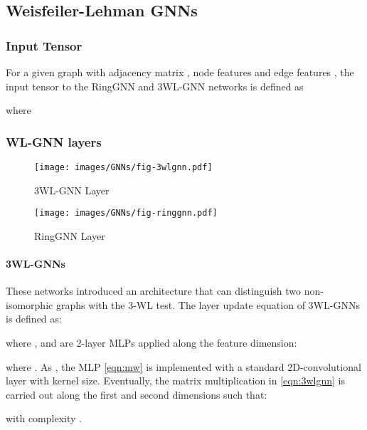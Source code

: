 \documentclass{article}
\begin{document}
\subsection{Weisfeiler-Lehman GNNs}
\label{sec:wlgnns}


\subsubsection{Input Tensor}


For a given graph with adjacency matrix , node features  and edge features , the input tensor to the RingGNN and 3WL-GNN networks is defined as 

where






\subsubsection{WL-GNN layers}
\begin{figure}[t!]
\centering
\begin{minipage}{.5\textwidth}
\centering
  \texttt{[image: images/GNNs/fig-3wlgnn.pdf]}
  \caption{3WL-GNN Layer}
  \label{fig:3wlgnn}
\end{minipage}\begin{minipage}{.5\textwidth}
\centering
  \texttt{[image: images/GNNs/fig-ringgnn.pdf]}
  \caption{RingGNN Layer}
  \label{fig:ringgnn}
\end{minipage}\end{figure}

\paragraph{3WL-GNNs \cite{maron2019provably}}
These networks introduced an architecture that can distinguish two non-isomorphic graphs with the 3-WL test. The layer update equation of 3WL-GNNs is defined as: 

where ,  and  are 2-layer MLPs applied along the feature dimension:

where . As , the MLP \eqref{eqn:mw} is implemented with a standard 2D-convolutional layer with  kernel size. Eventually, the matrix multiplication in \eqref{eqn:3wlgnn} is carried out along the first and second dimensions such that:

with complexity .
\end{document}

